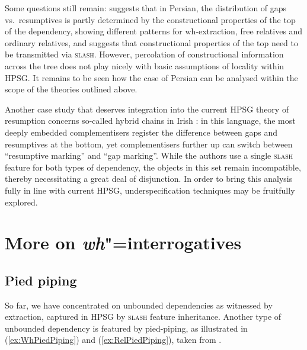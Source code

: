 \documentclass[output=paper
	        ,collection
	        ,collectionchapter
 	        ,biblatex
                ,babelshorthands
                ,newtxmath
                ,draftmode
                ,colorlinks, citecolor=brown
]{langscibook}
\begin{document}
{%
Some questions still remain: \citet[Section~6.5]{taghvaipour:phd:05}
suggests that in Persian, the distribution of gaps vs.\ resumptives is
partly determined by the constructional properties of the top of the
dependency, showing different patterns for wh-extraction, free
relatives and ordinary relatives, and suggests that constructional
properties of the top need to be transmitted via \textsc{slash}.
However, percolation of constructional information across the tree
does not play nicely with basic assumptions of locality within
HPSG. It remains to be seen how the case of Persian can be analysed
within the scope of the theories outlined above.

Another case study that deserves integration into the current HPSG
theory of resumption concerns so-called hybrid chains in Irish
\citep{assmann10:_does_chain_hybrid_irish_suppor}: in this language,
the most deeply embedded complementisers register the difference
between gaps and resumptives at the bottom, yet complementisers
further up can switch between ``resumptive marking'' and ``gap
marking''. While the authors use a single \textsc{slash} feature for
both types of dependency, the objects in this set remain incompatible,
thereby necessitating a great deal of disjunction. In order to bring
this analysis fully in line with current HPSG, underspecification
techniques may be fruitfully explored.



\section{More on \emph{wh}"=interrogatives}
\label{sec:UDC:MoreWh}

\subsection{Pied piping}

So far, we have concentrated on unbounded dependencies as witnessed by
extraction, captured in HPSG by \textsc{slash} feature
inheritance. Another type of unbounded dependency is featured by
pied-piping, as illustrated in (\ref{ex:WhPiedPiping}) and
(\ref{ex:RelPiedPiping}), taken from \citet{Ginzburg:Sag:01}\addpages.

}
\end{document}
